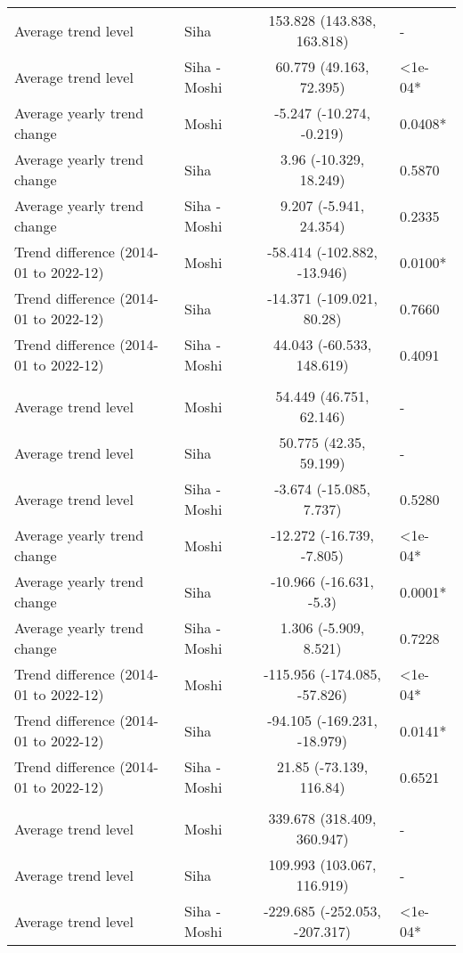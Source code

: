 \begin{longtable}{l|lcl}
Average trend level & Siha & 153.828 (143.838, 163.818) & - \\ 
Average trend level & Siha - Moshi & 60.779 (49.163, 72.395) & <1e-04* \\ 
Average yearly trend change & Moshi & -5.247 (-10.274, -0.219) & 0.0408* \\ 
Average yearly trend change & Siha & 3.96 (-10.329, 18.249) & 0.5870 \\ 
Average yearly trend change & Siha - Moshi & 9.207 (-5.941, 24.354) & 0.2335 \\ 
Trend difference (2014-01 to 2022-12) & Moshi & -58.414 (-102.882, -13.946) & 0.0100* \\ 
Trend difference (2014-01 to 2022-12) & Siha & -14.371 (-109.021, 80.28) & 0.7660 \\ 
Trend difference (2014-01 to 2022-12) & Siha - Moshi & 44.043 (-60.533, 148.619) & 0.4091 \\ 
\midrule\addlinespace[2.5pt]
\multicolumn{4}{l}{Malnutrition} \\ 
\midrule\addlinespace[2.5pt]
Average trend level & Moshi & 54.449 (46.751, 62.146) & - \\ 
Average trend level & Siha & 50.775 (42.35, 59.199) & - \\ 
Average trend level & Siha - Moshi & -3.674 (-15.085, 7.737) & 0.5280 \\ 
Average yearly trend change & Moshi & -12.272 (-16.739, -7.805) & <1e-04* \\ 
Average yearly trend change & Siha & -10.966 (-16.631, -5.3) & 0.0001* \\ 
Average yearly trend change & Siha - Moshi & 1.306 (-5.909, 8.521) & 0.7228 \\ 
Trend difference (2014-01 to 2022-12) & Moshi & -115.956 (-174.085, -57.826) & <1e-04* \\ 
Trend difference (2014-01 to 2022-12) & Siha & -94.105 (-169.231, -18.979) & 0.0141* \\ 
Trend difference (2014-01 to 2022-12) & Siha - Moshi & 21.85 (-73.139, 116.84) & 0.6521 \\ 
\midrule\addlinespace[2.5pt]
\multicolumn{4}{l}{Neurological} \\ 
\midrule\addlinespace[2.5pt]
Average trend level & Moshi & 339.678 (318.409, 360.947) & - \\ 
Average trend level & Siha & 109.993 (103.067, 116.919) & - \\ 
Average trend level & Siha - Moshi & -229.685 (-252.053, -207.317) & <1e-04* \\ 

\end{longtable}
